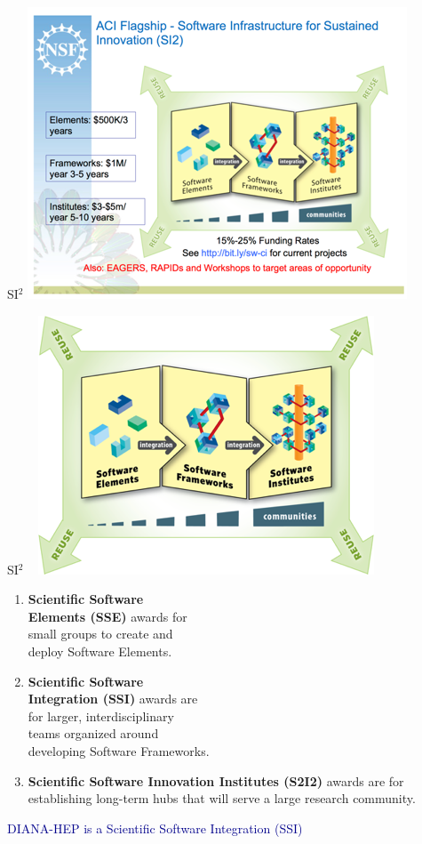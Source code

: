 \documentclass{beamer}
\begin{document}
\begin{frame}{SI$^2$}
\vspace{0.4 cm}
\includegraphics[width=\linewidth]{si2_puzzle.png}
\end{frame}

\begin{frame}{SI$^2$}
\vspace{0.75 cm}
\mbox{ } \hfill \mbox{\hspace{0.4 cm}\includegraphics[height=4 cm]{puzzle.png}\hspace{-0.4 cm}}

\vspace{-4 cm}
\begin{enumerate}
\item {\bf Scientific Software \\ Elements (SSE)} awards for \\ small groups to create and \\ deploy Software Elements.
\item {\bf Scientific Software \\ Integration (SSI)} awards are \\ for larger, interdisciplinary \\ teams organized around \\ developing Software Frameworks.
\item {\bf Scientific Software Innovation Institutes (S2I2)} awards are for establishing long-term hubs that will serve a large research community.
\end{enumerate}

\begin{center}
\textcolor{darkblue}{DIANA-HEP is a Scientific Software Integration (SSI)}
\end{center}
\end{frame}
\end{document}
